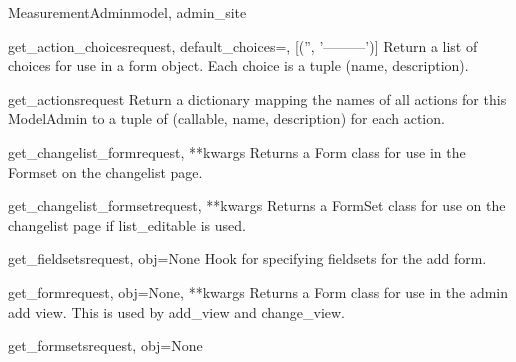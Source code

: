 \documentclass[letterpaper,10pt,english]{sphinxmanual}
\begin{document}
\begin{classdesc}{MeasurementAdmin}{model, admin\_site}
\hypertarget{data.admin.MeasurementAdmin.get_action_choices}{}\begin{methoddesc}{get\_action\_choices}{request, default\_choices=, {[}('', '---------'){]}}
Return a list of choices for use in a form object.  Each choice is a
tuple (name, description).
\end{methoddesc}

\hypertarget{data.admin.MeasurementAdmin.get_actions}{}\begin{methoddesc}{get\_actions}{request}
Return a dictionary mapping the names of all actions for this
ModelAdmin to a tuple of (callable, name, description) for each action.
\end{methoddesc}

\hypertarget{data.admin.MeasurementAdmin.get_changelist_form}{}\begin{methoddesc}{get\_changelist\_form}{request, **kwargs}
Returns a Form class for use in the Formset on the changelist page.
\end{methoddesc}

\hypertarget{data.admin.MeasurementAdmin.get_changelist_formset}{}\begin{methoddesc}{get\_changelist\_formset}{request, **kwargs}
Returns a FormSet class for use on the changelist page if list\_editable
is used.
\end{methoddesc}

\hypertarget{data.admin.MeasurementAdmin.get_fieldsets}{}\begin{methoddesc}{get\_fieldsets}{request, obj=None}
Hook for specifying fieldsets for the add form.
\end{methoddesc}

\hypertarget{data.admin.MeasurementAdmin.get_form}{}\begin{methoddesc}{get\_form}{request, obj=None, **kwargs}
Returns a Form class for use in the admin add view. This is used by
add\_view and change\_view.
\end{methoddesc}

\hypertarget{data.admin.MeasurementAdmin.get_formsets}{}\begin{methoddesc}{get\_formsets}{request, obj=None}\end{methoddesc}


\end{classdesc}
\end{document}
